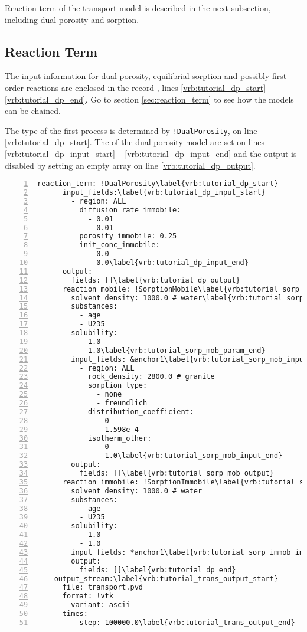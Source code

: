 Reaction term of the transport model is described in the next subsection, including dual porosity and sorption.

\subsection{Reaction Term}\label{subsubsec:reactions}
The input information for dual porosity, equilibrial sorption and possibly first order reactions are enclosed in the record 
, lines \ref{vrb:tutorial_dp_start} -- \ref{vrb:tutorial_dp_end}. Go to section \ref{sec:reaction_term}
to see how the models can be chained.

The type of the first process is determined by {\tt !DualPorosity}, on line \ref{vrb:tutorial_dp_start}. 
The 
of the dual porosity model are set on lines \ref{vrb:tutorial_dp_input_start} -- \ref{vrb:tutorial_dp_input_end} and the output is disabled by setting an empty array on line \ref{vrb:tutorial_dp_output}.

\begin{Verbatim}[numbers=left, firstnumber=last,commandchars=\\\{\}]
    reaction_term: !DualPorosity\label{vrb:tutorial_dp_start}
      input_fields:\label{vrb:tutorial_dp_input_start}
        - region: ALL
          diffusion_rate_immobile:
            - 0.01
            - 0.01
          porosity_immobile: 0.25
          init_conc_immobile:
            - 0.0
            - 0.0\label{vrb:tutorial_dp_input_end}
      output:
        fields: []\label{vrb:tutorial_dp_output}
      reaction_mobile: !SorptionMobile\label{vrb:tutorial_sorp_mob}
        solvent_density: 1000.0 # water\label{vrb:tutorial_sorp_mob_param_start}
        substances:
          - age
          - U235
        solubility:
          - 1.0
          - 1.0\label{vrb:tutorial_sorp_mob_param_end}
        input_fields: &anchor1\label{vrb:tutorial_sorp_mob_input_start}
          - region: ALL
            rock_density: 2800.0 # granite
            sorption_type:
              - none
              - freundlich
            distribution_coefficient:
              - 0
              - 1.598e-4
            isotherm_other:
              - 0
              - 1.0\label{vrb:tutorial_sorp_mob_input_end}
        output:
          fields: []\label{vrb:tutorial_sorp_mob_output}
      reaction_immobile: !SorptionImmobile\label{vrb:tutorial_sorp_immob}
        solvent_density: 1000.0 # water
        substances:
          - age
          - U235
        solubility:
          - 1.0
          - 1.0
        input_fields: *anchor1\label{vrb:tutorial_sorp_immob_input}
        output:
          fields: []\label{vrb:tutorial_dp_end}
    output_stream:\label{vrb:tutorial_trans_output_start}
      file: transport.pvd
      format: !vtk
        variant: ascii
      times:
        - step: 100000.0\label{vrb:tutorial_trans_output_end}
\end{Verbatim}

